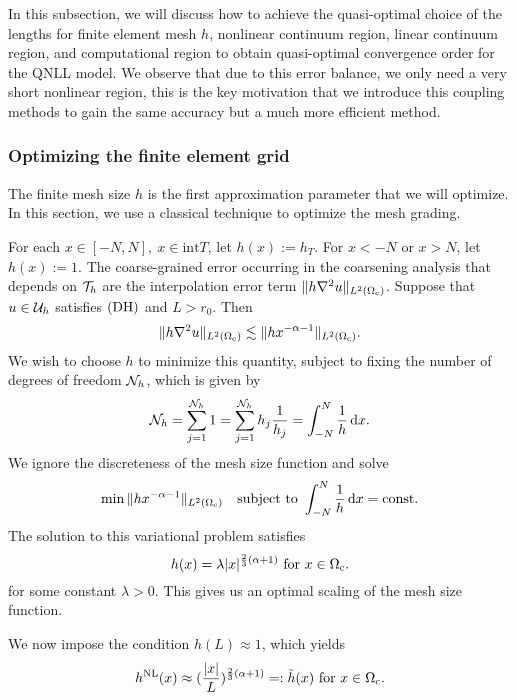 In this subsection, we will discuss how to achieve the quasi-optimal choice of the lengths for finite element mesh $h$, nonlinear continuum region, linear continuum region, and computational region to obtain quasi-optimal convergence order for the QNLL model. We observe that due to this error balance, we only need a very short nonlinear region, this is the key motivation that we introduce this coupling methods to gain the same accuracy but a much more efficient method.

\subsubsection{Optimizing the finite element grid}
\label{sec: choice_of_fem_cg}
The finite mesh size $h$ is the first approximation parameter that we will optimize. In this section, we use a classical technique to optimize the mesh grading.

For each $x\in [-N,N], \ x\in \text{int} T$, let $h(x):=h_{T}$. For $x<-N$ or $x>N$, let $h(x):=1$. The coarse-grained error occurring in the coarsening analysis that depends on $\mathcal{T}_{h}$ are the interpolation error term $\Vert h \nabla^{2}u\Vert_{L^{2}(\Omega_{{\rm c}})}$. Suppose that $u\in\mathcal{U}_{h}$ satisfies $\textbf{\rm (DH)}$ and $L >r_{0}$. Then
\begin{equation*}
	\Vert h \nabla^{2}u\Vert_{L^{2}(\Omega_{{\rm c}})} \lesssim \Vert h x^{-\alpha-1}\Vert_{L^{2}(\Omega_{{\rm c}})}.
\end{equation*}
We wish to choose $h$ to minimize this quantity, subject to fixing the number of degrees of freedom $\mathcal{N}_{h}$, which is given by
\begin{equation*}
	\mathcal{N}_{h}=\sum_{j=1}^{\mathcal{N}_{h}}1=\sum_{j=1}^{\mathcal{N}_{h}} h_{j}\frac{1}{h_{j}}=\int_{-N}^{N}\frac{1}{h} \,\text{d} x.
\end{equation*}
We ignore the discreteness of the mesh size function and solve
\begin{equation*}
	\min \Vert h x^{-\alpha-1}\Vert_{L^{2}(\Omega_{{\rm c}})} \quad \text{subject to }\int_{-N}^{N} \frac{1}{h}\,\text{d} x = \text{const}.
\end{equation*}
The solution to this variational problem satisfies
\begin{equation*}
	h(x)=\lambda\vert x\vert^{\frac{2}{3}(\alpha+1)} \ \text{for }x\in \Omega_{{\rm c}}.
\end{equation*}
for some constant $\lambda>0$. This gives us an optimal scaling of the mesh size function.

We now impose the condition $h(L)\approx 1$, which yields
\begin{equation}\label{Mesh size fucntion of nonlinear h}
	h^{\text{NL}}(x)\approx(\frac{\vert x\vert}{L})^{\frac{2}{3}(\alpha+1)}=:\tilde{h}(x) \ \text{for }x\in\Omega_{{\rm c}}.
\end{equation}

